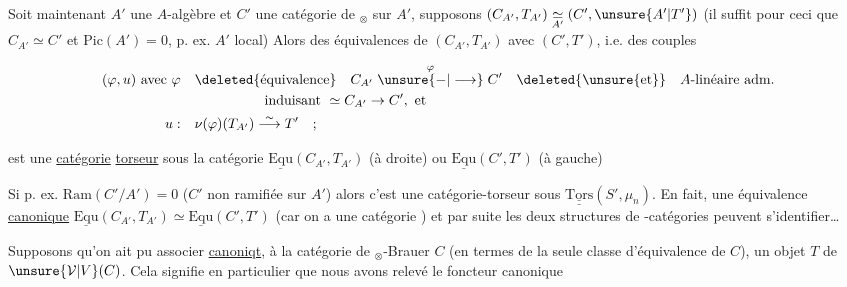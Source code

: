   Soit maintenant $A'$ une $A$-algèbre 
et $C'$ une catégorie de $_\otimes$ sur $A'$, 
supposons $(C_{A'},T_{A'})\underset{A'}{\simeq}(C',\unsure{A'|T'})$
(il suffit pour ceci que $C_{A'}\simeq C'$ et $\mathrm{Pic}(A')=0$,
p. ex. $A'$ local) Alors  des équivalences
de $(C_{A'},T_{A'})$ avec $(C',T')$, i.e. des couples

\[
\begin{aligned}
\text{$(\varphi,u)$ avec $\varphi$}\quad &\deleted{\text{équivalence}}\quad C_{A'}\mathrel{\overset{\varphi}{\unsure{-|\longrightarrow}}} C'\quad \deleted{\unsure{\mathrm{et}}}\quad A\text{-linéaire adm.}\\
&\hspace{5em}\text{induisant }\simeq C_{A'}\to C',\text{ et}\\
u:\quad &\nu(\varphi)(T_{A'})\overset{\sim}{\longrightarrow}T'\quad ;
\end{aligned}
\]

est une \uline{catégorie} \uline{torseur} sous la  catégorie
 $\underline{\mathrm{Equ}}(C_{A'},T_{A'})$ (à droite) ou $\underline{\mathrm{Equ}}(C',T')$ (à gauche)

Si p. ex. $\mathrm{Ram}(C'/A')=0$ ($C'$ non ramifiée sur $A'$)
 alors c'est une catégorie-torseur sous
 $\underline{\underline{\mathrm{Tors}}}(S',\mu_n)$. En fait,  une équivalence
\uline{canonique} $\underline{\mathrm{Equ}}(C_{A'},T_{A'})\simeq\underline{\mathrm{Equ}}(C',T')$ (car on a
une  catégorie ) et par suite
les deux structures de -catégories peuvent
s'identifier\ldots


Supposons qu'on ait pu associer \uline{canoniqt},
à la catégorie de $_\otimes$-Brauer $C$ (en termes de
la seule classe d'équivalence de $C$), un objet
$T$ de $\unsure{\mathcal V|V}(C)$. Cela signifie en particulier que
nous avons relevé le foncteur canonique 

